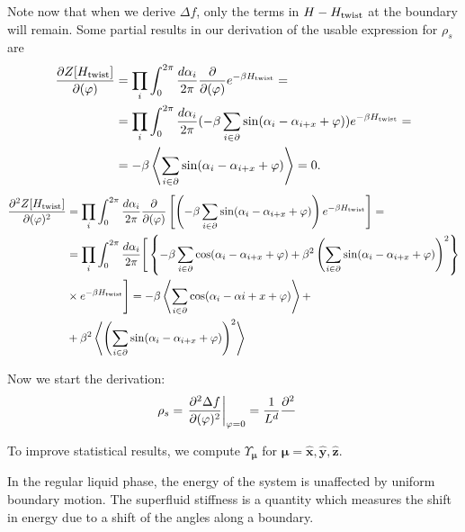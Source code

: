 Note now that when we derive $\Delta f$, only the terms in $H - H_{\textrm{twist}}$ at the boundary will remain.
Some partial results in our derivation of the usable expression for $\rho_s$ are
\begin{align}
  \frac{\partial Z[H_{\textrm{twist}}]}{\partial (\varphi)} &=  \prod_{i}\int_{0}^{2\pi}\frac{d \alpha_i}{2\pi} \frac{\partial}{\partial (\varphi)}e^{ -\beta H_{\textrm{twist}}} = \\
  &= \prod_{i}\int_{0}^{2\pi}\frac{d \alpha_i}{2\pi} (-\beta\sum\limits_{i\in\partial} \sin(\alpha_i - \alpha_{i+x} + \varphi))e^{ -\beta H_{\textrm{twist}}} =\\
  &= -\beta\left\langle \sum_{i\in\partial}\sin(\alpha_i-\alpha_{i+x}+\varphi) \right\rangle = 0.
  \label{}
\end{align}
\begin{align}
  \frac{\partial^2 Z[H_{\textrm{twist}}]}{\partial (\varphi)^2} &= \prod_{i}\int_{0}^{2\pi}\frac{d \alpha_i}{2\pi} \frac{\partial}{\partial (\varphi)}\left[\left(-\beta\sum_{i\in\partial}\sin(\alpha_i - \alpha_{i+x} + \varphi)\right)e^{ -\beta H_{\textrm{twist}}}\right] =\\
  &= \prod_{i}\int_{0}^{2\pi}\frac{d \alpha_i}{2\pi}\Bigg[ \left\{-\beta\sum_{i\in\partial}\cos(\alpha_i - \alpha_{i+x} + \varphi) + \beta^2\left(\sum_{i\in\partial}\sin(\alpha_i - \alpha_{i+x} + \varphi)\right)^2\right\}\\
  &\times e^{ -\beta H_{\textrm{twist}}} \Bigg] = -\beta\left\langle \sum_{i\in\partial}\cos(\alpha_i -\alpha{i+x} +\varphi) \right\rangle +\\
  &+ \beta^2 \left\langle \left(\sum_{i\in\partial} \sin(\alpha_i - \alpha_{i+x}+\varphi)\right)^2\right\rangle
  \label{}
\end{align}

Now we start the derivation:
\begin{align}
  \rho_s &= \left.\frac{\partial^2 \Delta f}{\partial( \varphi)^2}\right|_{\varphi=0} = \frac{1}{L^d}\frac{\partial^2}{}
  \label{}
\end{align}


To improve statistical results, we compute $\Upsilon_{\bm{\mu}}$ for $\bm{\mu} = \bm{\hat{x}},\bm{\hat{y}},\bm{\hat{z}}$.

In the regular liquid phase, the energy of the system is unaffected by uniform boundary motion. The superfluid stiffness is a quantity which measures the shift in energy due to a shift of the angles along a boundary.


